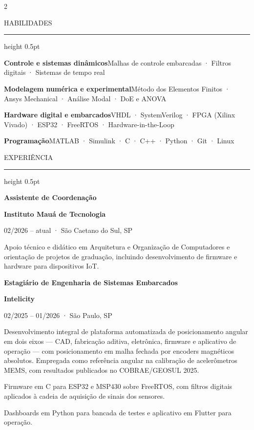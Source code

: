 \documentclass[10pt,a4paper]{article}
\newcommand{\secao}[1]{%
  \Needspace*{6\baselineskip}%
  \vspace{4pt}%
  {\display\fontsize{9.6}{9.6}\selectfont\color{tinta}%
   \addfontfeature{LetterSpace=13}\MakeUppercase{#1}}\par
  \vspace{1.8pt}%
  {\color{filete}\hrule height 0.5pt}%
  \nopagebreak\vspace{6.5pt}%
  \nopagebreak%
}
\newcommand{\cargo}[1]{{\fontsize{9.5}{11.0}\selectfont\bfseries\color{tinta}#1}\par}
\newcommand{\org}[1]{{\fontsize{8.7}{10.0}\selectfont\bfseries\color{meio}#1}\par}
\newcommand{\periodo}[1]{{\fontsize{8.1}{9.4}\selectfont\color{claro}#1}\par\vspace{1pt}}
\newcommand{\espaco}{\vspace{5pt}}
\newcommand{\bloco}[3]{\par\noindent\begin{minipage}{\linewidth}%
  \cargo{#1}\org{#2}\periodo{#3}\end{minipage}\nopagebreak\vspace{1.5pt}}
\begin{document}
\vspace{4pt}

\setlength{\columnsep}{0.72cm}
\begin{paracol}{2}

\secao{Habilidades}

{\fontsize{8.5}{11.0}\selectfont\color{corpo}
{\bfseries\color{tinta}Controle e sistemas dinâmicos}\quad Malhas de controle embarcadas · Filtros digitais · Sistemas de tempo real\par
\vspace{2.5pt}
{\bfseries\color{tinta}Modelagem numérica e experimental}\quad Método dos Elementos Finitos · Ansys Mechanical · Análise Modal · DoE e ANOVA\par
\vspace{2.5pt}
{\bfseries\color{tinta}Hardware digital e embarcados}\quad VHDL · SystemVerilog · FPGA (Xilinx Vivado) · ESP32 · FreeRTOS · Hardware-in-the-Loop\par
\vspace{2.5pt}
{\bfseries\color{tinta}Programação}\quad MATLAB · Simulink · C · C++ · Python · Git · Linux\par}

\espaco
\secao{Experiência}

\bloco{Assistente de Coordenação}{Instituto Mauá de Tecnologia}{02/2026 – atual · São Caetano do Sul, SP}
\begin{itens}
  \item Apoio técnico e didático em Arquitetura e Organização de Computadores e orientação de projetos de graduação, incluindo desenvolvimento de firmware e hardware para dispositivos IoT.
\end{itens}

\vspace{7pt}
\bloco{Estagiário de Engenharia de Sistemas Embarcados}{Intelicity}{02/2025 – 01/2026 · São Paulo, SP}
\begin{itens}
  \item Desenvolvimento integral de plataforma automatizada de posicionamento angular em dois eixos — CAD, fabricação aditiva, eletrônica, firmware e aplicativo de operação — com posicionamento em malha fechada por encoders magnéticos absolutos. Empregada como referência angular na calibração de acelerômetros MEMS, com resultados publicados no COBRAE/GEOSUL 2025.
  \item Firmware em C para ESP32 e MSP430 sobre FreeRTOS, com filtros digitais aplicados à cadeia de aquisição de sinais dos sensores.
  \item Dashboards em Python para bancada de testes e aplicativo em Flutter para operação.
\end{itens}


\end{paracol}
\end{document}
